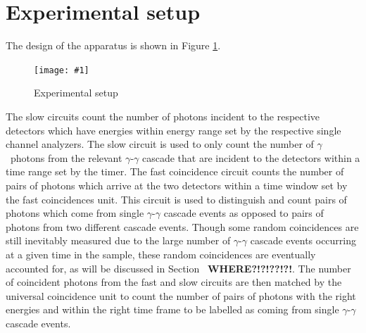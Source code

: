 \documentclass[twocolumn]{article}
\newcommand{\insertFigure}[1]{%
   \texttt{[image: \#1]}%
}
\begin{document}
\section{Experimental setup}
The design of the apparatus is shown in Figure \ref{fig:exp_setup}. 
\begin{figure}[!h]
	\centering
	\insertFigure{k223_setup.png}
	\caption{Experimental setup \cite{booklet}}
	\label{fig:exp_setup}
\end{figure}
The slow circuits count the number of photons incident to the respective detectors which have energies within energy range set by the respective single channel analyzers. The slow circuit is used to only count the number of $\gamma$~photons from the relevant $\gamma$-$\gamma$ cascade that are incident to the detectors within a time range set by the timer. The fast coincidence circuit counts the number of pairs of photons which arrive at the two detectors within a time window set by the fast coincidences unit. This circuit is used to distinguish and count pairs of photons which come from single $\gamma$-$\gamma$ cascade events as opposed to pairs of photons from two different cascade events. Though some random coincidences are still inevitably measured due to the large number of $\gamma$-$\gamma$ cascade events occurring at a given time in the sample, these random coincidences are eventually accounted for, as will be discussed in Section~ \textbf{WHERE?!?!??!?!}. The number of coincident photons from the fast and slow circuits are then matched by the universal coincidence unit to count the number of pairs of photons with the right energies and within the right time frame to be labelled as coming from single $\gamma$-$\gamma$ cascade events.
\end{document}
